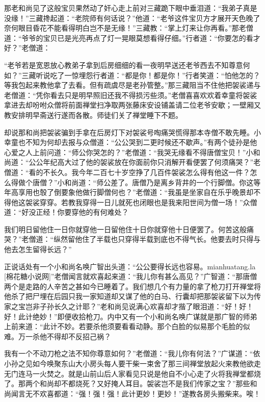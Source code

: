 \documentclass[12pt,UTF8]{ctexbook}
\begin{document}
{那老和尚见了这般宝贝果然动了奸心走上前对三藏跪下眼中垂泪道：“我弟子真是没缘！”三藏搀起道：“老院师有何话说？”他道：“老爷这件宝贝方才展开天色晚了奈何眼目昏花不能看得明白岂不是无缘！”三藏教：“掌上灯来让你再看。”那老僧道：“爷爷的宝贝已是光亮再点了灯一晃眼莫想看得仔细。”行者道：“你要怎的看才好？”老僧道：

“老爷若是宽恩放心教弟子拿到后房细细的看一夜明早送还老爷西去不知尊意何如？”三藏听说吃了一惊埋怨行者道：“都是你！都是你！”行者笑道：“怕他怎的？等我包起来教他拿了去看。但有疏虞尽是老孙管整。”那三藏阻当不住他把袈裟递与老僧道：“凭你看去只是明早照旧还我不得损污些须。”老僧喜喜欢欢着幸童将袈裟拿进去却吩咐众僧将前面禅堂扫净取两张藤床安设铺盖请二位老爷安歇；一壁厢又教安排明早斋送行遂而各散。师徒们关了禅堂睡下不题。

却说那和尚把袈裟骗到手拿在后房灯下对袈裟号啕痛哭慌得那本寺僧不敢先睡。小幸童也不知为何却去报与众僧道：“公公哭到二更时候还不歇声。”有两个徒孙是他心爱之人上前问道：“师公你哭怎的？”老僧道：“我哭无缘看不得唐僧宝贝！”小和尚道：“公公年纪高大过了他的袈裟放在你面前你只消解开看便罢了何须痛哭？”老僧道：“看的不长久。我今年二百七十岁空挣了几百件袈裟怎么得有他这一件？怎么得做个唐僧？”小和尚道：“师公差了。唐僧乃是离乡背井的一个行脚僧。你这等年高享用也彀了倒要象他做行脚僧何也？”老僧道：“我虽是坐家自在乐乎晚景却不得他这袈裟穿穿。若教我穿得一日儿就死也闭眼也是我来阳世间为僧一场！”众僧道：“好没正经！你要穿他的有何难处？

我们明日留他住一日你就穿他一日留他住十日你就穿他十日便罢了。何苦这般痛哭？”老僧道：“纵然留他住了半载也只穿得半载到底也不得气长。他要去时只得与他去怎生留得长远？”

正说话处有一个小和尚名唤广智出头道：“公公要得长远也容易。mianhuatang.la [棉花糖小说网]”老僧闻言就欢喜起来道：“我儿你有甚么高见？”广智道：“那唐僧两个是走路的人辛苦之甚如今已睡着了。我们想几个有力量的拿了枪刀打开禅堂将他杀了把尸埋在后园只我一家知道却又谋了他的白马、行囊却把那袈裟留下以为传家之宝岂非子孙长久之计耶？”老和尚见说满心欢喜却才揩了眼泪道：“好！好！好！此计绝妙！”即便收拾枪刀。内中又有一个小和尚名唤广谋就是那广智的师弟上前来道：“此计不妙。若要杀他须要看看动静。那个白脸的似易那个毛脸的似难。万一杀他不得却不反招己祸？

我有一个不动刀枪之法不知你尊意如何？”老僧道：“我儿你有何法？”广谋道：“依小孙之见如今唤聚东山大小房头每人要干柴一束舍了那三间禅堂放起火来教他欲走无门连马一火焚之。就是山前山后人家看见只说是他自不小心走了火将我禅堂都烧了。那两个和尚却不都烧死？又好掩人耳目。袈裟岂不是我们传家之宝？”那些和尚闻言无不欢喜都道：“强！强！强！此计更妙！更妙！”遂教各房头搬柴来。唉！

}
\end{document}

